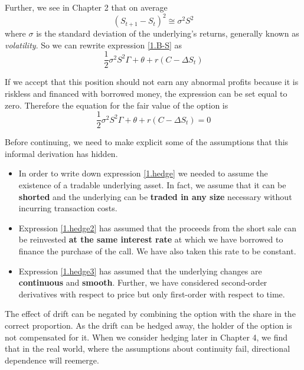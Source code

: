 \documentclass[11pt]{report}
\begin{document}
		Further, we see in Chapter 2 that on average
		\begin{equation}
			(S_{t+1} - S_t)^2 \cong \sigma^2 S^2
		\end{equation}
		where $\sigma$ is the standard deviation of the underlying’s returns, generally known as \textit{volatility}. So we can rewrite expression \eqref{1.B-S} as
		\begin{equation}
			\frac{1}{2} \sigma^2 S^2 \Gamma + \theta + r (C - \Delta S_t)
		\end{equation}

		If we accept that this position should not earn any abnormal profits because it is riskless and financed with borrowed money, the expression can be set equal to zero. Therefore the equation for the fair value of the option is
		\begin{equation}
			\frac{1}{2} \sigma^2 S^2 \Gamma + \theta + r (C - \Delta S_t) = 0
			\label{1.B-S_final}
		\end{equation}

		Before continuing, we need to make explicit some of the assumptions that this informal derivation has hidden.
		\begin{itemize}
			\item In order to write down expression \eqref{1.hedge} we needed to assume the existence of a tradable underlying asset. In fact, we assume that it can be \textbf{shorted} and the underlying can be \textbf{traded in any size} necessary without incurring transaction costs.
			\item Expression \eqref{1.hedge2} has assumed that the proceeds from the short sale can be reinvested \textbf{at the same interest rate} at which we have borrowed to finance the purchase of the call. We have also taken this rate to be constant.
			\item Expression \eqref{1.hedge3} has assumed that the underlying changes are \textbf{continuous} and \textbf{smooth}. Further, we have considered second-order derivatives with respect to price but only first-order with respect to time.
		\end{itemize}

		The effect of drift can be negated by combining the option with the share in the correct proportion. As the drift can be hedged away, the holder of the option is not compensated for it. When we consider hedging later in Chapter 4, we find that in the real world, where the assumptions about continuity fail, directional dependence will reemerge.
\end{document}
